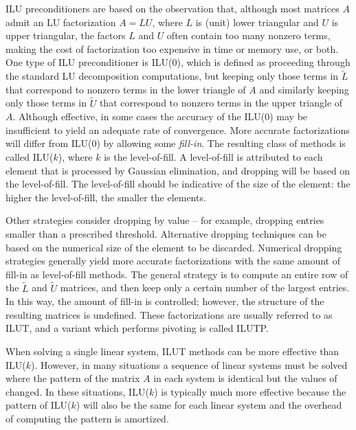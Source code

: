 ILU preconditioners are based on the observation
that, although most matrices $A$ admit an LU factorization $A=LU$, where $L$ is
(unit) lower triangular and $U$ is upper triangular, the factors $L$ and $U$ often
contain too many nonzero terms, making the cost of factorization too expensive in
time or memory use, or both.  One type of ILU preconditioner is ILU(0), which 
is defined as proceeding through the standard LU decomposition computations, but keeping 
only those terms in $\tilde{L}$ that correspond to nonzero terms in the lower
triangle of $A$ and similarly keeping only those terms in $\tilde{U}$ that 
correspond to nonzero terms in the upper triangle of $A$.  Although effective, in
some cases the accuracy of the ILU(0) may be insufficient to yield an
adequate rate of convergence. More accurate factorizations will differ
from ILU(0) by allowing some {\em fill-in}. The resulting class of
methods is called ILU($k$), where $k$ is the level-of-fill. A
level-of-fill is attributed to each element that is processed by
Gaussian elimination, and dropping will be based on the level-of-fill.
The level-of-fill should be indicative of the size of the element: the
higher the level-of-fill, the smaller the elements.  

Other strategies consider dropping by value -- for example, dropping
entries smaller than a prescribed threshold. Alternative dropping
techniques can be based on the numerical size of the element to be
discarded. Numerical dropping strategies generally yield more accurate
factorizations with the same amount of fill-in as level-of-fill
methods. The general strategy is to compute an entire row of the
$\tilde{L}$ and $\tilde{U}$ matrices, and then keep only a certain
number of the largest
entries. In this way, the amount of fill-in is
controlled; however, the structure of the resulting matrices is
undefined. These factorizations are usually referred to as ILUT, and a
variant which performs pivoting is called ILUTP.  

When solving a single linear system, ILUT methods can be more effective
than ILU($k$).  However, in many situations a sequence of linear systems
must be solved where the pattern of the matrix $A$ in each system is
identical but the values of changed.  In these situations, ILU($k$) is 
typically much more effective because the pattern of ILU($k$) will also
be the same for each linear system and the overhead of computing the
pattern is amortized.

